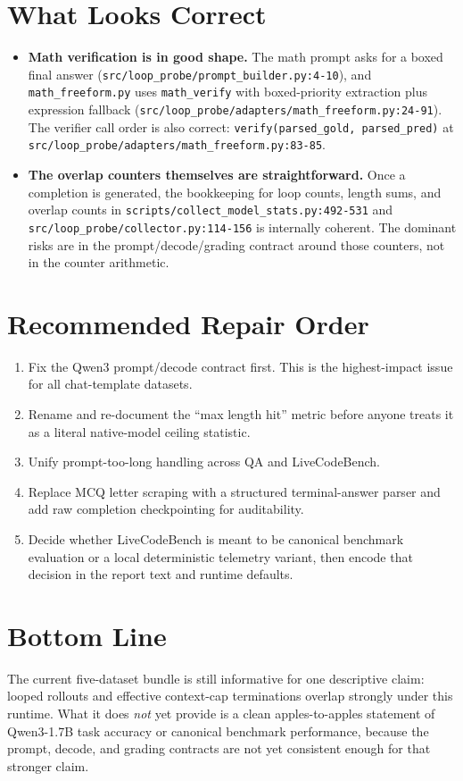 \documentclass[11pt]{article}
\begin{document}
\section*{What Looks Correct}
\begin{itemize}
\item \textbf{Math verification is in good shape.} The math prompt asks for a boxed
final answer (\texttt{src/loop\_probe/prompt\_builder.py:4-10}), and
\texttt{math\_freeform.py} uses \texttt{math\_verify} with boxed-priority extraction
plus expression fallback (\texttt{src/loop\_probe/adapters/math\_freeform.py:24-91}).
The verifier call order is also correct: \texttt{verify(parsed\_gold, parsed\_pred)}
at \texttt{src/loop\_probe/adapters/math\_freeform.py:83-85}.
\item \textbf{The overlap counters themselves are straightforward.} Once a completion
is generated, the bookkeeping for loop counts, length sums, and overlap counts in
\texttt{scripts/collect\_model\_stats.py:492-531} and
\texttt{src/loop\_probe/collector.py:114-156} is internally coherent. The dominant
risks are in the prompt/decode/grading contract around those counters, not in the
counter arithmetic.
\end{itemize}

\section*{Recommended Repair Order}
\begin{enumerate}
\item Fix the Qwen3 prompt/decode contract first. This is the highest-impact issue for
all chat-template datasets.
\item Rename and re-document the ``max length hit'' metric before anyone treats it as
a literal native-model ceiling statistic.
\item Unify prompt-too-long handling across QA and LiveCodeBench.
\item Replace MCQ letter scraping with a structured terminal-answer parser and add raw
completion checkpointing for auditability.
\item Decide whether LiveCodeBench is meant to be canonical benchmark evaluation or a
local deterministic telemetry variant, then encode that decision in the report text
and runtime defaults.
\end{enumerate}

\section*{Bottom Line}
The current five-dataset bundle is still informative for one descriptive claim:
looped rollouts and effective context-cap terminations overlap strongly under this
runtime. What it does \emph{not} yet provide is a clean apples-to-apples statement of
Qwen3-1.7B task accuracy or canonical benchmark performance, because the prompt,
decode, and grading contracts are not yet consistent enough for that stronger claim.
\end{document}
